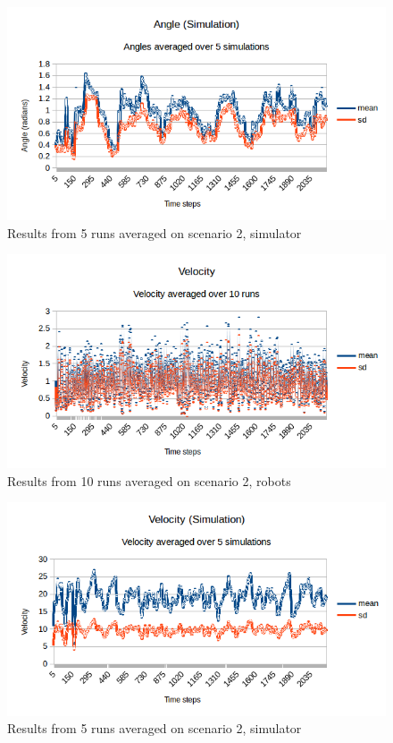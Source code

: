 \begin{figure}[h]
\begin{center}
\includegraphics[width=0.8\linewidth]{figs/runs/2sangle}
\end{center}
\caption[2. Angles, robots]{Results from 5 runs averaged on scenario 2, simulator}
\label{fig:res2sang}
\end{figure}
\begin{figure}[h]
\begin{center}
\includegraphics[width=0.8\linewidth]{figs/runs/2pvel}
\end{center}
\caption[2. Velocity, robots]{Results from 10 runs averaged on scenario 2, robots}
\label{fig:res2pvel}
\end{figure}
\begin{figure}[h]
\begin{center}
\includegraphics[width=0.8\linewidth]{figs/runs/2svel}
\end{center}
\caption[2. Velocity, robots]{Results from 5 runs averaged on scenario 2, simulator}
\label{fig:res2svel}
\end{figure}
\clearpage
